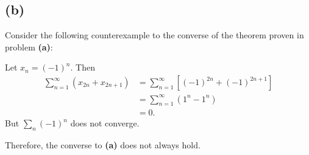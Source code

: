 \documentclass{article}
\begin{document}
\subsection*{(b)}
Consider the following counterexample to the converse of the theorem proven in problem \textbf{(a)}:

Let $x_n = (-1)^n$. Then 
\begin{align}
	\sum_{n=1}^{\infty}\left(x_{2n} +x_{2n+1}\right) &= \sum_{n=1}^{\infty}\left[(-1)^{2n} + (-1)^{2n+1}\right] \\
	&= \sum_{n=1}^{\infty}\left(1^n - 1^n \right) \\
	&= 0.
\end{align}
But $\sum_n (-1)^n$ does not converge. 

Therefore, the converse to \textbf{(a)} does not always hold.
\end{document}
